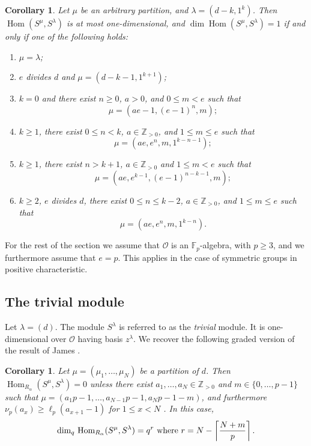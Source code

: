 \documentclass[twoside,11pt,reqno,letter]{amsart}
\numberwithin{equation}{section}
\newtheorem{Corollary}[equation]{Corollary}
\theoremstyle{definition}  %
\newcommand{\Hom}{\operatorname{Hom}}
\def\qdim{{\operatorname{dim}_q}\,}
\newcommand{\F}{\mathbb{F}}
\newcommand{\Z}{\mathbb{Z}}
\newcommand{\0}{{\bar 0}}
\newcommand{\1}{{\bar 1}}
\newcommand{\la}{\lambda}
\newcommand{\al}{\alpha}
\renewcommand\O{\mathcal O}
\begin{document}
{\begin{Corollary}
  Let $\mu$ be an arbitrary partition, and $\la = (d-k, 1^k)$. Then $\Hom(S^\mu, S^\la)$ is at most one-dimensional, and $\dim \Hom(S^\mu, S^\la) = 1$ if and only if one of the following holds:
  \begin{enumerate}
    \item $\mu = \la$;
    \item $e$ divides $d$ and $\mu = (d-k-1, 1^{k+1})$;
    \item $k = 0$ and there exist $n \geq 0$, $a > 0$, and $0 \leq m < e$ such that 
$$\mu = (ae-1, (e-1)^n, m);$$
    \item $k \geq 1$, there exist $0 \leq n < k$, $a \in \Z_{>0}$, and $1 \leq m \leq e$ such that 
$$\mu = (a e, e^n, m, 1^{k-n-1});$$
    \item $k \geq 1$, there exist $n > k+1$, $a \in \Z_{>0}$ and $1 \leq m < e$ such that 
$$\mu = (a e, e^{k-1}, (e - 1)^{n-k-1}, m);$$
    \item $k \geq 2$, $e$ divides $d$, there exist $0 \leq n \leq k-2$, $a \in \Z_{>0}$, and $1 \leq m \leq e$ such that 
$$\mu = (a e, e^n, m, 1^{k-n}).$$
  \end{enumerate}
\end{Corollary}

For the rest of the section we assume that $\O$ is an $\F_p$-algebra, with $p \geq 3$, and we furthermore assume that $e=p$. This applies in the case of symmetric groups in positive characteristic.

\subsection{The trivial module}

Let $\la = (d)$. The module $S^{\la}$ is referred to as the \emph{trivial} module. It is one-dimensional over $\O$ having basis $z^\la$. 
We recover the following graded version of the result of James \cite[Theorem 24.4]{J}.

\begin{Corollary}\label{cor:triv}
  Let $\mu = (\mu_1, \dots, \mu_N)$ be a partition of $d$. Then $\Hom_{R_\al}(S^\mu, S^\la) = 0$ unless there exist $a_1, \dots, a_N \in \Z_{>0}$ and $m \in \{0, \dots, p-1\}$ such that $\mu = (a_1 p - 1, \dots, a_{N-1} p - 1, a_N p - 1 - m)$, and furthermore $\nu_p(a_x) \geq \ell_p(a_{x+1} - 1)$ for $1 \leq x < N$ . In this case, 
  $$\qdim \Hom_{R_\al}(S^\mu, S^\la) = q^r \textup{ where } r=N-\left\lceil \frac{N+m}{p} \right\rceil.$$
\end{Corollary}

}
\end{document}
